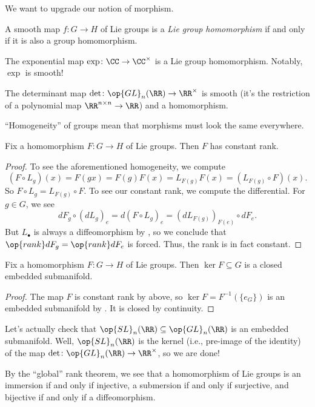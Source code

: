 \documentclass[../notes.tex]{subfiles}
\begin{document}
We want to upgrade our notion of morphism.
\begin{definition}[homomorphism]
	A smooth map $f\colon G\to H$ of Lie groups is a \textit{Lie group homomorphism} if and only if it is also a group homomorphism.
\end{definition}
\begin{example}
	The exponential map $\exp\colon\CC\to\CC^\times$ is a Lie group homomorphism. Notably, $\exp$ is smooth!
\end{example}
\begin{example} \label{ex:det-is-hom}
	The determinant map $\det\colon\op{GL}_n(\RR)\to\RR^\times$ is smooth (it's the restriction of a polynomial map $\RR^{n\times n}\to\RR$) and a homomorphism.
\end{example}
``Homogeneity'' of groups mean that morphisms must look the same everywhere.
\begin{proposition} \label{prop:hom-is-constant-rank}
	Fix a homomorphism $F\colon G\to H$ of Lie groups. Then $F$ has constant rank.
\end{proposition}
\begin{proof}
	To see the aforementioned homogeneity, we compute
	\[(F\circ L_g)(x)=F(gx)=F(g)F(x)=L_{F(g)}F(x)=\left(L_{F(g)}\circ F\right)(x).\]
	So $F\circ L_g=L_{F(g)}\circ F$. To see our constant rank, we compute the differential. For $g\in G$, we see
	\[dF_g\circ(dL_g)_e=d(F\circ L_g)_e=(dL_{F(g)})_{F(e)}\circ dF_e.\]
	But $L_\bullet$ is always a diffeomorphism by , so we conclude that $\op{rank}dF_g=\op{rank}dF_e$ is forced. Thus, the rank is in fact constant.
\end{proof}
\begin{corollary}
	Fix a homomorphism $F\colon G\to H$ of Lie groups. Then $\ker F\subseteq G$ is a closed embedded submanifold.
\end{corollary}
\begin{proof}
	The map $F$ is constant rank by  above, so $\ker F=F^{-1}(\{e_G\})$ is an embedded submanifold by . It is closed by continuity.
\end{proof}
\begin{example}
	Let's actually check that $\op{SL}_n(\RR)\subseteq\op{GL}_n(\RR)$ is an embedded submanifold. Well, $\op{SL}_n(\RR)$ is the kernel (i.e., pre-image of the identity) of the map $\det\colon\op{GL}_n(\RR)\to\RR^\times$, so we are done!
\end{example}
\begin{remark}
	By the ``global'' rank theorem, we see that a homomorphism of Lie groups is an immersion if and only if injective, a submersion if and only if surjective, and bijective if and only if a diffeomorphism.
\end{remark}
\end{document}
